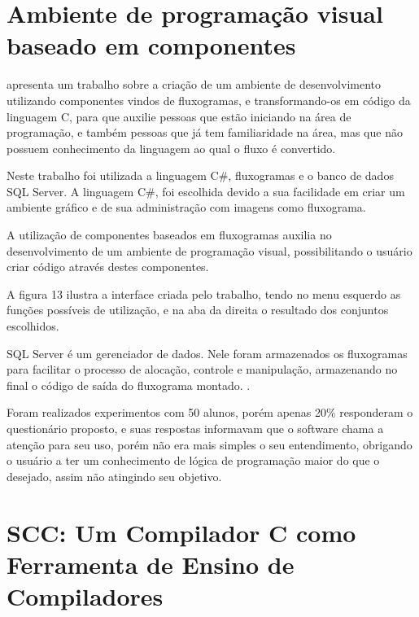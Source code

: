 \documentclass[12pt,oneside,a4paper,chapter=TITLE,section=TITLE,sumario=tradicional]{abntex2}
\begin{document}
\section{Ambiente de programação visual baseado em componentes}
\label{sec:ambiente-de-programacao-visual-baseado-em-componentes}
 
\cite{juliana2015} apresenta um trabalho sobre a criação de um ambiente de desenvolvimento utilizando componentes vindos de fluxogramas, e transformando-os em código da linguagem C, para que auxilie pessoas que estão iniciando na área de programação, e também pessoas que já tem familiaridade na área, mas que não possuem conhecimento da linguagem ao qual o fluxo é convertido.

Neste trabalho foi utilizada a linguagem C\#, fluxogramas e o banco de dados SQL Server. A linguagem C\#, foi escolhida devido a sua facilidade em criar um ambiente gráfico e de sua administração com imagens como fluxograma.

A utilização de componentes baseados em fluxogramas auxilia no desenvolvimento de um ambiente de programação visual, possibilitando o usuário criar código através destes componentes.

A figura 13 ilustra a interface criada pelo trabalho, tendo no menu esquerdo as funções possíveis de utilização, e na aba da direita o resultado dos conjuntos escolhidos. 

\begin{figure}[htb]
\end{figure}

SQL Server é um gerenciador de dados. Nele foram armazenados os fluxogramas para facilitar o processo de alocação, controle e manipulação, armazenando no final o código de saída do fluxograma montado. \cite{juliana2015}.

Foram realizados experimentos com 50 alunos, porém apenas 20\% responderam o questionário proposto, e suas respostas informavam que o software chama a atenção para seu uso, porém não era mais simples o seu entendimento, obrigando o usuário a ter um conhecimento de lógica de programação maior do que o desejado, assim não atingindo seu objetivo. 

\section{SCC: Um Compilador C como Ferramenta de Ensino de Compiladores}
\label{sec:scc}
 
\end{document}

